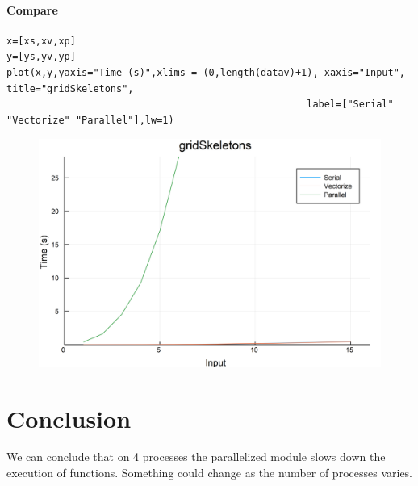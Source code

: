 \documentclass{article}
\begin{document}
\paragraph{Compare}
\begin{flushleft}\small
\begin{list}{}{} \item
    \begin{Verbatim}[tabsize=4]
x=[xs,xv,xp]
y=[ys,yv,yp]
plot(x,y,yaxis="Time (s)",xlims = (0,length(datav)+1), xaxis="Input", title="gridSkeletons",
                                                    label=["Serial" "Vectorize" "Parallel"],lw=1)
    \end{Verbatim}
\end{list}
\end{flushleft}   

\begin{figure}[h!]
\centering
\includegraphics[scale=0.06]{gridSkeletonsCom.png}
\end{figure}

\section{Conclusion}
We can conclude that on 4 processes the parallelized module slows down the execution of functions. 
Something could change as the number of processes varies. 
\end{document}
